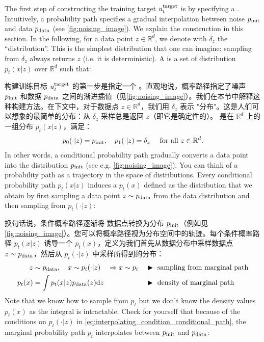 The first step of constructing the training target $u^{\text{target}}_t$ is by specifying a . Intuitively, a probability path specifies a gradual interpolation between noise $p_{\rm{init}}$ and data $p_{\rm{data}}$ (see \cref{fig:noising_image}). We explain the construction in this section. In the following, for a data point $z\in\mathbb{R}^d$, we denote with $\delta_{z}$ the  ``distribution''. This is the simplest distribution that one can imagine: sampling from $\delta_{z}$ always returns $z$ (i.e. it is deterministic). A  is a set of distribution $p_t(x|z)$ over $\mathbb{R}^d$ such that:

构建训练目标 $u^{\text{target}}_t$ 的第一步是指定一个 。直观地说，概率路径指定了噪声 $p_{\rm{init}}$ 和数据 $p_{\rm{data}}$ 之间的渐进插值（见\cref{fig:noising_image}）。我们在本节中解释这种构建方法。在下文中，对于数据点 $z\in\mathbb{R}^d$，我们用 $\delta_{z}$ 表示  "分布"。这是人们可以想象的最简单的分布：从 $\delta_{z}$ 采样总是返回 $z$（即它是确定性的）。 是在 $\mathbb{R}^d$ 上的一组分布 $p_t(x|z)$，满足：
\begin{align}
\label{eq:interpolating_condition_conditional_path}
    p_0(\cdot|z)=p_{\rm{init}}, \quad p_1(\cdot|z)=\delta_{z}\quad \text{ for all }z\in\mathbb{R}^d.
\end{align}
In other words, a conditional probability path gradually converts a  data point into the distribution $p_{\rm{init}}$ (see e.g. \cref{fig:noising_image}). You can think of a probability path as a trajectory in the space of distributions. Every conditional probability path $p_t(x|z)$ induces a  $p_t(x)$ defined as the distribution that we obtain by first sampling a data point $z\sim p_{\rm{data}}$ from the data distribution and then sampling from $p_t(\cdot|z)$:

换句话说，条件概率路径逐渐将  数据点转换为分布 $p_{\rm{init}}$（例如见\cref{fig:noising_image}）。您可以将概率路径视为分布空间中的轨迹。每个条件概率路径 $p_t(x|z)$ 诱导一个  $p_t(x)$，定义为我们首先从数据分布中采样数据点 $z\sim p_{\rm{data}}$，然后从 $p_t(\cdot|z)$ 中采样所得到的分布：
\begin{align}
    \label{eq:marginal_prob_path}
    z&\sim p_{\rm{data}}, \quad x\sim p_t(\cdot|z)\quad \Rightarrow x\sim p_t &&\blacktriangleright\,\,\text{sampling from marginal path}\\
    p_t(x) &= \int p_t(x|z) p_{\rm{data}} (z) \mathrm{d} z &&\blacktriangleright\,\,\text{density of marginal path}
\end{align}
Note that we know how to sample from $p_t$ but we don't know the density values $p_t(x)$ as the integral is intractable. Check for yourself that because of the conditions on $p_t(\cdot|z)$ in \cref{eq:interpolating_condition_conditional_path}, the marginal probability path $p_t$ interpolates between $p_{\rm{init}}$ and $p_{\rm{data}}$:

